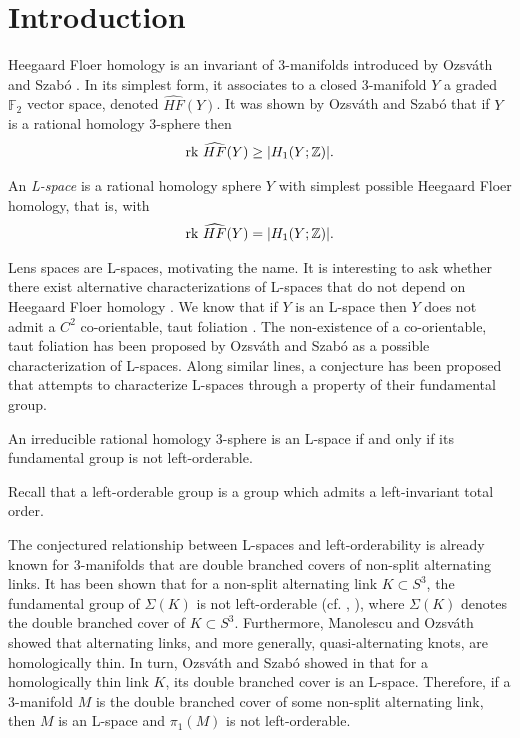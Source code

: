\section{Introduction}

Heegaard Floer homology is an invariant of 3-manifolds introduced by Ozsv\'{a}th and Szab\'{o} \cite{OzsvathSzabo}. In its simplest form, it associates to a closed 3-manifold $Y$ a graded $\mathbb{F}_2$ vector space, denoted $\widehat{HF}(Y)$. It was shown by Ozsv\'{a}th and Szab\'{o} \cite[Proposition 5.1]{OS2} that if $Y$ is a rational homology 3-sphere then
\begin{align*}
\textup{rk }\widehat{HF}(Y)\geq{}|H_1(Y ; \mathbb{Z})|.
\end{align*}

\begin{definition}An \emph{L-space} is a rational homology sphere $Y$ with simplest possible Heegaard Floer homology, that is, with
\begin{align*}
\textup{rk } \widehat{HF}(Y) = |H_1(Y ; \mathbb{Z})|.
\end{align*}
\end{definition}

Lens spaces are L-spaces, motivating the name. It is interesting to ask whether there exist alternative characterizations of L-spaces that do not depend on Heegaard Floer homology \cite[Question 11]{OS4}. We know that if $Y$ is an L-space then $Y$ does not admit a $C^{2}$ co-orientable, taut foliation \cite{OS3}. The non-existence of a co-orientable, taut foliation has been proposed by Ozsv\'{a}th and Szab\'{o} as a possible characterization of L-spaces. Along similar lines, a conjecture has been proposed \cite{BoyerGordonWatson} that attempts to characterize L-spaces through a property of their fundamental group.

\begin{conjecture_main}
An irreducible rational homology 3-sphere is an L-space if and only if its fundamental group is not left-orderable.
\end{conjecture_main}

Recall that a left-orderable group is a group which admits a left-invariant total order.

The conjectured relationship between L-spaces and left-orderability is already known for 3-manifolds that are double branched covers of non-split alternating links. It has been shown that for a non-split alternating link $K\subset S^3$, the fundamental group of $\Sigma{}(K)$ is not left-orderable \cite{BoyerGordonWatson} (cf. \cite{GreeneJE}, \cite{Ito}), where $\Sigma{}(K)$ denotes the double branched cover of $K\subset{}S^3$. Furthermore, Manolescu and Ozsv\'{a}th \cite{ManolescuOzsvath} showed that alternating links, and more generally, quasi-alternating knots, are homologically thin. In turn, Ozsv\'{a}th and Szab\'{o} showed in \cite{OzsvathandSzabo} that for a homologically thin link $K$, its double branched cover is an L-space. Therefore, if a 3-manifold $M$ is the double branched cover of some non-split alternating link, then $M$ is an L-space and $\pi_1(M)$ is not left-orderable.

